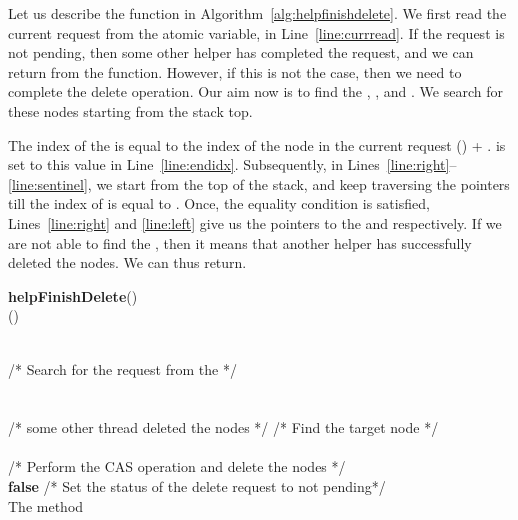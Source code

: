 \documentclass{llncs}
\begin{document}
Let us describe the  function in Algorithm~\ref{alg:helpfinishdelete}. 
We first read the current request from the atomic variable,  in Line~\ref{line:currread}. If
the request is not pending, then some other helper has completed the request, and we can return from the function.
However, if this is not the case, then we need to complete the delete operation. Our aim now is to find the ,
, and . We search for these nodes starting from the stack top.

The index of the  is equal to the index of the node in the current request () + . 
 is set to this value in Line~\ref{line:endidx}.
Subsequently, in Lines~\ref{line:right}--\ref{line:sentinel}, we start from the top of the stack, and keep traversing the 
pointers till the index of  is equal to . Once, the equality condition is satisfied,
Lines~\ref{line:right} and \ref{line:left} give us the pointers to the  and  respectively. If
we are not able to find the , then it means that another helper has successfully deleted the nodes. We can
thus return. \\

\vspace{-8mm}
\begin{algorithm}
\scriptsize
\SetAlgoLined
\textbf{helpFinishDelete}(){}\\
		  () \label{line:currread} \\
		\If{}
		{
			
		}
  	 \label{line:endidx}\\

			
			                   /* Search for the request from the  */ \\
		       \\	
			\While{  } {
				   \label{line:right} \\
				   \label{line:left}
			}
			\If{} {
				 /* some other thread deleted the nodes */
			} \label{line:sentinel}
/* Find the target node */ \\
		    \label{line:targetstart}\\
		 \label{line:targetend}
 /* Perform the CAS operation and delete the nodes */ \label{line:rightcas} \\
  \textbf{false} /* Set the status of the delete request to not pending*/ \label{line:setpending}\\

\caption{The  method} \label{alg:helpfinishdelete}
\end{algorithm}
\vspace{-8mm}
\end{document}
